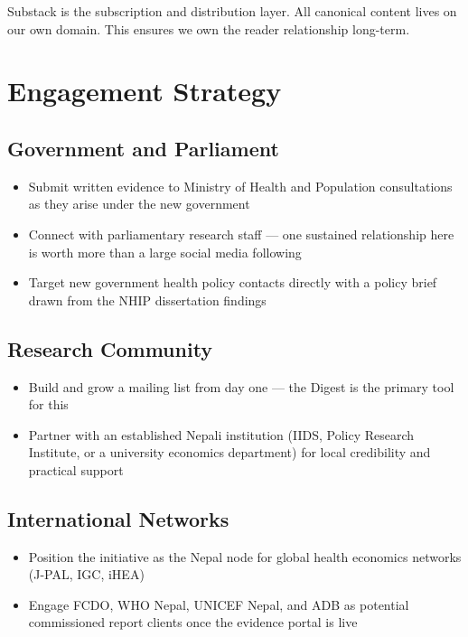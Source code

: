 \documentclass[11pt, a4paper]{article}
\begin{document}
Substack is the subscription and distribution layer. All canonical content lives on our own domain. This ensures we own the reader relationship long-term.

\section{Engagement Strategy}

\subsection{Government and Parliament}

\begin{itemize}
  \item Submit written evidence to Ministry of Health and Population consultations as they arise under the new government
  \item Connect with parliamentary research staff --- one sustained relationship here is worth more than a large social media following
  \item Target new government health policy contacts directly with a policy brief drawn from the NHIP dissertation findings
\end{itemize}

\subsection{Research Community}

\begin{itemize}
  \item Build and grow a mailing list from day one --- the Digest is the primary tool for this
  \item Partner with an established Nepali institution (IIDS, Policy Research Institute, or a university economics department) for local credibility and practical support
\end{itemize}

\subsection{International Networks}

\begin{itemize}
  \item Position the initiative as the Nepal node for global health economics networks (J-PAL, IGC, iHEA)
  \item Engage FCDO, WHO Nepal, UNICEF Nepal, and ADB as potential commissioned report clients once the evidence portal is live
\end{itemize}
\end{document}
